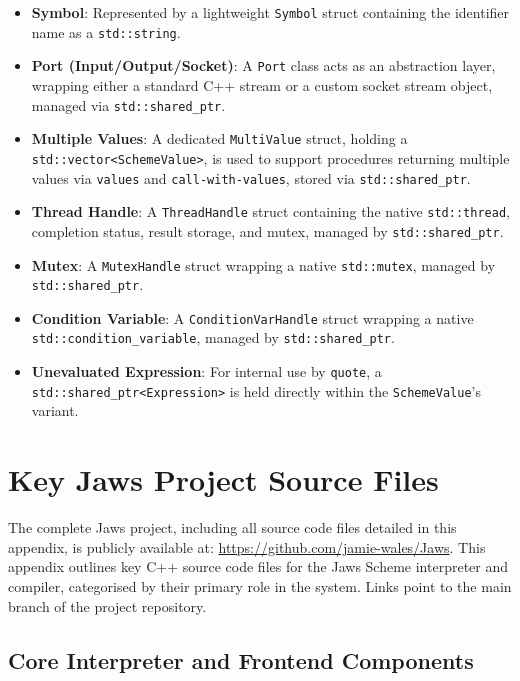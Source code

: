 \documentclass[final]{cmpreport_02}
\begin{document}
\begin{itemize}
    \item \textbf{Symbol}: Represented by a lightweight \texttt{Symbol} struct containing the identifier name as a \texttt{std::string}.
    \item \textbf{Port (Input/Output/Socket)}: A \texttt{Port} class acts as an abstraction layer, wrapping either a standard C++ stream or a custom socket stream object, managed via \texttt{std::shared\_ptr}.
    \item \textbf{Multiple Values}: A dedicated \texttt{MultiValue} struct, holding a \newline\texttt{std::vector<SchemeValue>}, is used to support procedures returning multiple values via \texttt{values} and \texttt{call-with-values}, stored via \texttt{std::shared\_ptr}.
    \item \textbf{Thread Handle}: A \texttt{ThreadHandle} struct containing the native \texttt{std::thread}, completion status, result storage, and mutex, managed by \texttt{std::shared\_ptr}.
    \item \textbf{Mutex}: A \texttt{MutexHandle} struct wrapping a native \texttt{std::mutex}, managed by \texttt{std::shared\_ptr}.
    \item \textbf{Condition Variable}: A \texttt{ConditionVarHandle} struct wrapping a native \newline\texttt{std::condition\_variable}, managed by \texttt{std::shared\_ptr}.
    \item \textbf{Unevaluated Expression}: For internal use by \texttt{quote}, a \newline\texttt{std::shared\_ptr<Expression>} is held directly within the \texttt{SchemeValue}'s variant.
\end{itemize}



\section{Key Jaws Project Source Files}
\label{app:jaws-source-files}

The complete Jaws project, including all source code files detailed in this appendix, is publicly available at: \url{https://github.com/jamie-wales/Jaws}.
This appendix outlines key C++ source code files for the Jaws Scheme interpreter and compiler, categorised by their primary role in the system. Links point to the main branch of the project repository.

\subsection{Core Interpreter and Frontend Components}
\end{document}
